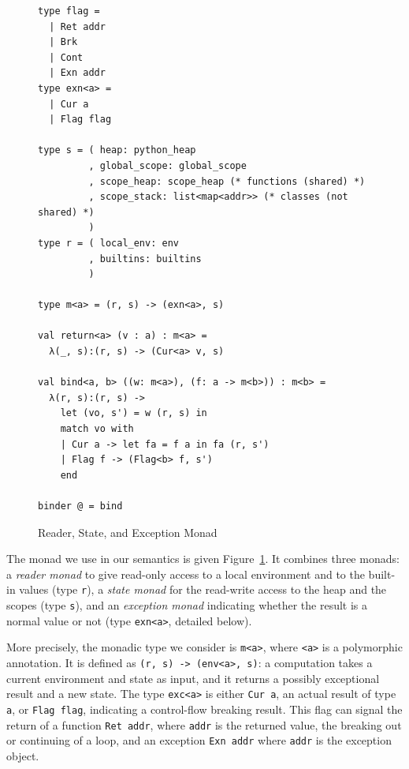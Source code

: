 \documentclass[submission,copyright,creativecommons]{eptcs}
\newcommand{\skinl}[1]{\texttt{#1}}
\begin{document}
\begin{figure}
\centering
\begin{minipage}{0.6\textwidth}
\begin{verbatim}
type flag =
  | Ret addr
  | Brk
  | Cont
  | Exn addr
type exn<a> =
  | Cur a
  | Flag flag

type s = ( heap: python_heap
         , global_scope: global_scope
         , scope_heap: scope_heap (* functions (shared) *)
         , scope_stack: list<map<addr>> (* classes (not shared) *)
         )
type r = ( local_env: env
         , builtins: builtins
         )

type m<a> = (r, s) -> (exn<a>, s)

val return<a> (v : a) : m<a> =
  λ(_, s):(r, s) -> (Cur<a> v, s)

val bind<a, b> ((w: m<a>), (f: a -> m<b>)) : m<b> =
  λ(r, s):(r, s) ->
    let (vo, s') = w (r, s) in
    match vo with
    | Cur a -> let fa = f a in fa (r, s')
    | Flag f -> (Flag<b> f, s')
    end

binder @ = bind
\end{verbatim}
\end{minipage}
\caption{Reader, State, and Exception Monad}\label{fig:skelmonad}
\end{figure}

The monad we use in our semantics is given Figure~\ref{fig:skelmonad}. It
combines three monads: a \emph{reader monad} to give read-only access to a local
environment and to the built-in values (type \skinl{r}), a \emph{state monad}
for the read-write access to the heap and the scopes (type \skinl{s}), and an \emph{exception monad}
indicating whether the result is a normal value or not (type \skinl{exn<a>},
detailed below).

More precisely, the monadic type we consider is \skinl{m<a>}, where \skinl{<a>} is
a polymorphic annotation. It is defined as \skinl{(r, s) -> (env<a>, s)}: a
computation takes a current environment and state as input, and it returns a
possibly exceptional result and a new state.
The type \skinl{exc<a>} is either
\skinl{Cur a}, an actual result of type \skinl{a}, or \skinl{Flag flag},
indicating a control-flow breaking result. This flag can signal the return of a
function \skinl{Ret addr}, where \skinl{addr} is the returned value, the
breaking out or continuing of a loop, and an exception \skinl{Exn addr} where
\skinl{addr} is the exception object.
\end{document}
